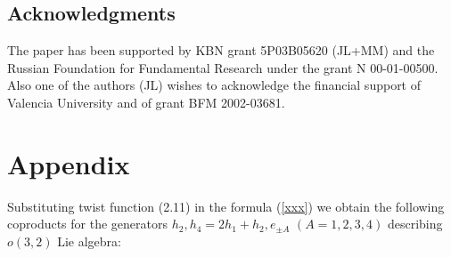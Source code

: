 \documentclass[a4paper,12pt,showkeys]{article}
\begin{document}
\subsection*{Acknowledgments}
The paper has been supported by KBN grant 5P03B05620 (JL+MM) and
the Russian Foundation for Fundamental Research under the grant N
00-01-00500. Also one of the authors (JL) wishes to acknowledge
the financial support
 of Valencia University and of grant BFM 2002-03681.



\section*{Appendix}

Substituting twist function (2.11) in the formula
(\ref{xxx}) we obtain the following coproducts for the generators
$h_2, h_4 = 2 h_1 + h_2, e_{\pm A}$ $(A=1,2,3,4)$ describing
$o(3,2)$ Lie algebra:
\end{document}
